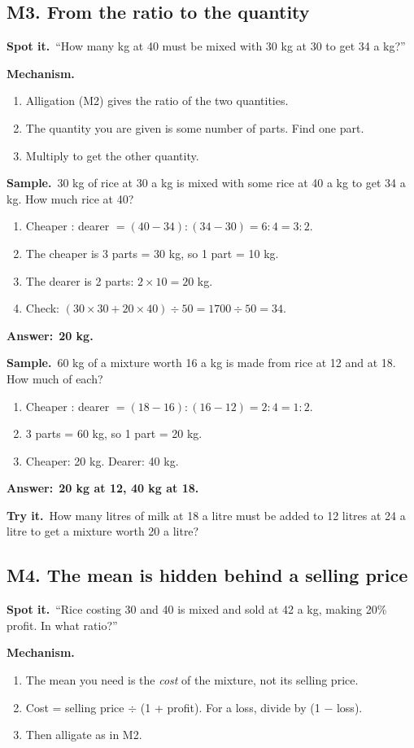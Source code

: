 \documentclass[11pt,a4paper]{article}
\let\oldsubsection\subsection
\renewcommand{\subsection}{\needspace{9\baselineskip}\oldsubsection}
\newcommand{\spot}{\textbf{\color{ember}Spot it.}\ }
\newcommand{\mech}{\textbf{\color{ember}Mechanism.}\ }
\newif\ifkeepsamp
\newcommand{\ans}[1]{\par\nopagebreak\noindent\textbf{\color{ember}Answer:}\ \textbf{#1}\par}
\newcommand{\samp}{\ifkeepsamp\needspace{4\baselineskip}\fi\textbf{\color{ember}Sample.}\ }
\newcommand{\tryit}[1]{\textbf{\color{ember}Try it.}\ #1}
\begin{document}
\subsection{M3. From the ratio to the quantity}
\spot ``How many kg at 40 must be mixed with 30 kg at 30 to get 34 a kg?''

\mech
\begin{enumerate}
\item Alligation (M2) gives the ratio of the two quantities.
\item The quantity you are given is some number of parts. Find one part.
\item Multiply to get the other quantity.
\end{enumerate}

\samp 30 kg of rice at 30 a kg is mixed with some rice at 40 a kg to get 34 a kg. How much rice at 40?
\begin{enumerate}
\item Cheaper : dearer $= (40 - 34) : (34 - 30) = 6 : 4 = 3 : 2$.
\item The cheaper is 3 parts = 30 kg, so 1 part = 10 kg.
\item The dearer is 2 parts: $2 \times 10 = 20$ kg.
\item Check: $(30 \times 30 + 20 \times 40) \div 50 = 1700 \div 50 = 34$.
\end{enumerate}
\ans{20 kg.}

\samp 60 kg of a mixture worth 16 a kg is made from rice at 12 and at 18. How much of each?
\begin{enumerate}
\item Cheaper : dearer $= (18 - 16) : (16 - 12) = 2 : 4 = 1 : 2$.
\item 3 parts = 60 kg, so 1 part = 20 kg.
\item Cheaper: 20 kg. Dearer: 40 kg.
\end{enumerate}
\ans{20 kg at 12, 40 kg at 18.}

\tryit How many litres of milk at 18 a litre must be added to 12 litres at 24 a litre to get a mixture worth 20 a litre?

\subsection{M4. The mean is hidden behind a selling price}
\spot ``Rice costing 30 and 40 is mixed and sold at 42 a kg, making 20\% profit. In what ratio?''

\mech
\begin{enumerate}
\item The mean you need is the \emph{cost} of the mixture, not its selling price.
\item Cost = selling price $\div$ (1 + profit). For a loss, divide by (1 $-$ loss).
\item Then alligate as in M2.
\end{enumerate}
\end{document}
